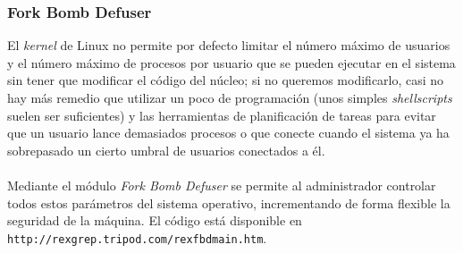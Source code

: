 \subsubsection{Fork Bomb Defuser}
El {\it kernel} de Linux no permite por defecto limitar el n\'umero m\'aximo de 
usuarios y el n\'umero m\'aximo de procesos por usuario que se pueden ejecutar
en el sistema sin tener que modificar el c\'odigo del n\'ucleo; si no queremos 
modificarlo, casi no hay m\'as remedio que utilizar un poco de programaci\'on 
(unos simples {\it shellscripts} suelen ser suficientes) y las herramientas de
planificaci\'on de tareas para evitar que un usuario lance demasiados procesos
o que conecte cuando el sistema ya ha sobrepasado un cierto umbral de usuarios
conectados a \'el.\\
\\Mediante el m\'odulo {\it Fork Bomb Defuser} se permite al administrador 
controlar todos estos pa\-r\'a\-me\-tros del sistema operativo, incrementando 
de forma flexible la seguridad de la m\'aquina. El c\'odigo est\'a disponible 
en {\tt http://rexgrep.tripod.com/rexfbdmain.htm}.
